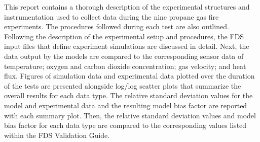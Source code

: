 This report contains a thorough description of the experimental structures and instrumentation used to collect data during the nine propane gas fire experiments. The procedures followed during each test are also outlined. Following the description of the experimental setup and procedures, the FDS input files that define experiment simulations are discussed in detail. Next, the data output by the models are compared to the corresponding sensor data of temperature; oxygen and carbon dioxide concentration; gas velocity; and heat flux. Figures of simulation data and experimental data plotted over the duration of the tests are presented alongside log/log scatter plots that summarize the overall results for each data type. The relative standard deviation values for the model and experimental data and the resulting model bias factor are reported with each summary plot. Then, the relative standard deviation values and model bias factor for each data type are compared to the corresponding values listed within the FDS Validation Guide. 